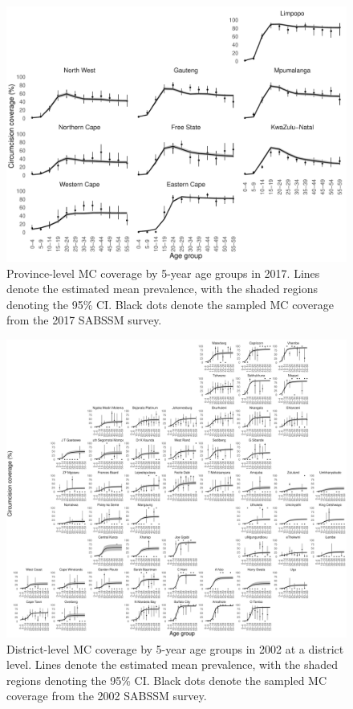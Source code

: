 \documentclass{article}
\begin{document}
\begin{appendix}

\begin{figure}[H]
	\centering
	\includegraphics[width = \linewidth]{Figures/suppmat/ModelFit/TotalPrev_5year_Province_2017_withsurveypoints}
	\caption{Province-level MC coverage by 5-year age groups in 2017. Lines denote the estimated mean prevalence, with the shaded regions denoting the 95\% CI. Black dots denote the sampled MC coverage from the 2017 SABSSM survey.}
\end{figure}


\begin{figure}[H]
	\centering
	\includegraphics[width = \linewidth]{Figures/suppmat/ModelFit/TotalPrev_5year_District_2002_withsurveypoints}
	\caption{District-level MC coverage by 5-year age groups in 2002 at a district level. Lines denote the estimated mean prevalence, with the shaded regions denoting the 95\% CI. Black dots denote the sampled MC coverage from the 2002 SABSSM survey.}
\end{figure}


\end{appendix}
\end{document}
